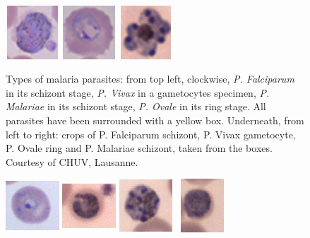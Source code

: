 {\begin{figure}[!t]
		\includegraphics[width=2cm, height=2cm]{images/malaria/f2_Pvivax_crop}
		\includegraphics[width=2cm, height=2cm]{images/malaria/f2_Povale_crop}
		\includegraphics[width=2cm, height=2cm]{images/malaria/f2_Pmalariae_crop}
		\caption[Malaria parasites.]{\label{fig5_malaria_types}Types of malaria parasites: from top left, clockwise, \emph{P. Falciparum} in its schizont stage, \emph{P. Vivax} in a gametocytes specimen, \emph{P. Malariae} in its schizont stage, \emph{P. Ovale} in its ring stage. All parasites have been surrounded with a yellow box. Underneath, from left to right: crops of P. Falciparum schizont, P. Vivax gametocyte, P. Ovale ring and P. Malariae schizont, taken from the boxes. Courtesy of CHUV, Lausanne.}
	\end{figure}
	
	\begin{figure}[!b]
		\centering
		\includegraphics[width=2cm, height=2cm]{images/malaria/falciparum_1_ring}
		\includegraphics[width=2cm, height=2cm]{images/malaria/falciparum_2_trophozoiteAge}
		\includegraphics[width=2cm, height=2cm]{images/malaria/falciparum_3_schizont}
		\includegraphics[width=2cm, height=2cm]{images/malaria/falciparum_4_gametocyte}
		

\end{figure}}
